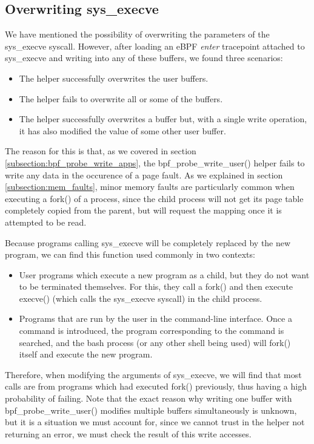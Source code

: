 \subsection{Overwriting sys\_execve} \label{subsection:sys_execve_writing}
We have mentioned the possibility of overwriting the parameters of the sys\_execve syscall. However, after loading an eBPF \textit{enter} tracepoint attached to sys\_execve and writing into any of these buffers, we found three scenarios:
\begin{itemize}
\item The helper successfully overwrites the user buffers.
\item The helper fails to overwrite all or some of the buffers.
\item The helper successfully overwrites a buffer but, with a single write operation, it has also modified the value of some other user buffer.
\end{itemize}

The reason for this is that, as we covered in section \ref{subsection:bpf_probe_write_apps}, the bpf\_probe\_write\_user() helper fails to write any data in the occurence of a page fault. As we explained in section \ref{subsection:mem_faults}, minor memory faults are particularly common when executing a fork() of a process, since the child process will not get its page table completely copied from the parent, but will request the mapping once it is attempted to be read.

Because programs calling sys\_execve will be completely replaced by the new program, we can find this function used commonly in two contexts:
\begin{itemize}
\item User programs which execute a new program as a child, but they do not want to be terminated themselves. For this, they call a fork() and then execute execve() (which calls the sys\_execve syscall) in the child process.
\item Programs that are run by the user in the command-line interface. Once a command is introduced, the program corresponding to the command is searched, and the bash process (or any other shell being used) will fork() itself and execute the new program.
\end{itemize}

Therefore, when modifying the arguments of sys\_execve, we will find that most calls are from programs which had executed fork() previously, thus having a high probability of failing. Note that the exact reason why writing one buffer with bpf\_probe\_write\_user() modifies multiple buffers simultaneously is unknown, but it is a situation we must account for, since we cannot trust in the helper not returning an error, we must check the result of this write accesses.

